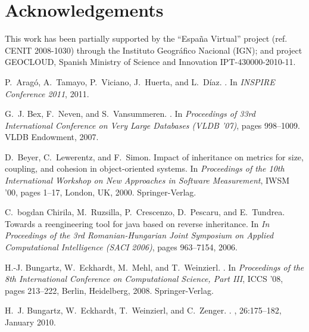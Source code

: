 \documentclass{sig-alternate}
\begin{document}
 
\section{Acknowledgements}
This work has been partially supported by the ``Espa\~{n}a Virtual'' project (ref. CENIT 2008-1030) through the Instituto Geogr\'{a}fico Nacional (IGN); and project GEOCLOUD, Spanish Ministry of Science and Innovation IPT-430000-2010-11.




\begin{thebibliography}{10}

P.~Arag\'{o}, A.~Tamayo, P.~Viciano, J.~Huerta, and L.~D\'{i}az.
.
\newblock In {\em INSPIRE Conference 2011}, 2011.

G.~J. Bex, F.~Neven, and S.~Vansummeren.
.
\newblock In {\em Proceedings of 33rd International Conference on Very Large
  Databases (VLDB '07)}, pages 998--1009. VLDB Endowment, 2007.

D.~Beyer, C.~Lewerentz, and F.~Simon.
\newblock Impact of inheritance on metrics for size, coupling, and cohesion in
  object-oriented systems.
\newblock In {\em Proceedings of the 10th International Workshop on New
  Approaches in Software Measurement}, IWSM '00, pages 1--17, London, UK, 2000.
  Springer-Verlag.

C.~bogdan Chirila, M.~Ruzsilla, P.~Crescenzo, D.~Pescaru, and E.~Tundrea.
\newblock Towards a reengineering tool for java based on reverse inheritance.
\newblock In {\em In Proceedings of the 3rd Romanian-Hungarian Joint Symposium
  on Applied Computational Intelligence (SACI 2006)}, pages 963--7154, 2006.

H.-J. Bungartz, W.~Eckhardt, M.~Mehl, and T.~Weinzierl.
.
\newblock In {\em Proceedings of the 8th International Conference on
  Computational Science, Part III}, ICCS '08, pages 213--222, Berlin,
  Heidelberg, 2008. Springer-Verlag.

H.~J. Bungartz, W.~Eckhardt, T.~Weinzierl, and C.~Zenger.
.
, 26:175--182, January 2010.


\end{thebibliography}
\end{document}
